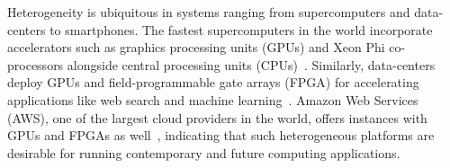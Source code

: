 






%

Heterogeneity is ubiquitous in systems ranging from supercomputers and data-centers
to smartphones. The fastest supercomputers in the world incorporate accelerators 
such as graphics processing units (GPUs) and Xeon Phi co-processors alongside central processing units
(CPUs)~\cite{top500nov}. Similarly, data-centers deploy GPUs and field-programmable
gate arrays (FPGA) for accelerating applications like  web search and machine
learning~\cite{catapultmicrosoft}. Amazon Web Services (AWS), one of the largest cloud
providers in the world, offers instances with GPUs and FPGAs as well~\cite{awsinstances}, indicating that such
heterogeneous platforms are desirable for running contemporary and future
computing applications.

